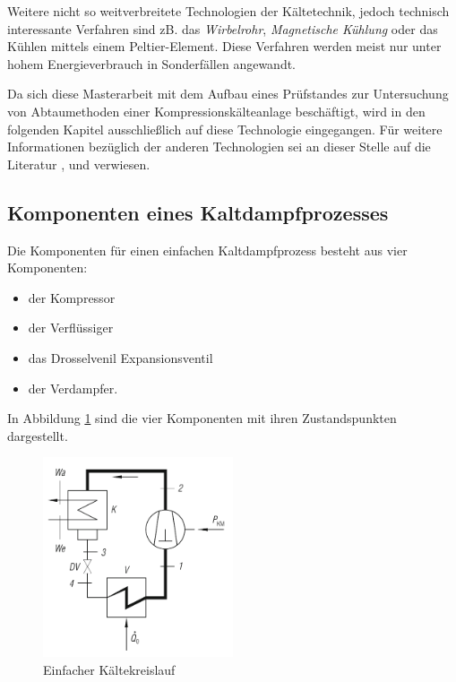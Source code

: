 Weitere nicht so weitverbreitete Technologien der Kältetechnik, jedoch technisch interessante Verfahren  sind zB. das  \textit{Wirbelrohr},  \textit{Magnetische Kühlung} oder das Kühlen mittels einem Peltier-Element. Diese Verfahren werden meist nur unter hohem Energieverbrauch in Sonderfällen angewandt. \citep{Grote2014}

Da sich diese Masterarbeit mit dem Aufbau eines Prüfstandes zur Untersuchung von Abtaumethoden einer Kompressionskälteanlage beschäftigt, wird in den folgenden Kapitel ausschließlich auf diese Technologie eingegangen. Für weitere Informationen bezüglich der anderen Technologien sei an dieser Stelle auf die Literatur \citep{Baehr2013}, \citep{Grote2014} und \citep{Grote2014} verwiesen.



\subsection{Komponenten eines Kaltdampfprozesses}
\label{subsec:Komponenten eines Kaltdampfprozesses}

Die Komponenten für einen einfachen Kaltdampfprozess  besteht aus vier Komponenten:

\begin{itemize}
\item der Kompressor
\item der Verflüssiger 
\item das Drosselvenil Expansionsventil
\item der Verdampfer. 
\end{itemize}

In Abbildung \ref{fig:einfacher Kältekreislauf} sind die vier Komponenten mit ihren Zustandspunkten dargestellt.

\begin{figure}[htb]
\centering		\includegraphics[width=0.50\textwidth]{Pictures/Kaltekreislauf_beahr.png}
\caption{Einfacher Kältekreislauf \citep{Baehr2013}}
\label{fig:einfacher Kältekreislauf}
\end{figure}

